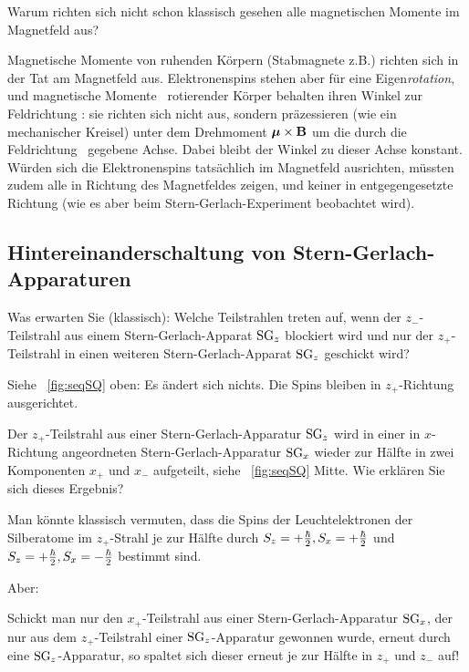\begin{zfrage}
 Warum richten sich nicht schon klassisch gesehen alle magnetischen Momente im Magnetfeld aus? 
\end{zfrage}
\begin{antw}
 Magnetische Momente von ruhenden K\"orpern (Stabmagnete z.B.) richten sich in der Tat am Magnetfeld aus. Elektronenspins stehen aber f\"ur eine Eigen\emph{rotation}, und magnetische Momente \magnmom\ rotierender K\"orper behalten ihren Winkel zur Feldrichtung \magnf: sie richten sich nicht aus, sondern pr\"azessieren (wie ein mechanischer Kreisel) unter dem Drehmoment $\boldsymbol{\mu} \times \mathbf{B}$ um die durch die Feldrichtung \magnf\ gegebene Achse. Dabei bleibt der Winkel zu dieser Achse konstant. W\"urden sich die Elektronenspins tats\"achlich im Magnetfeld ausrichten, m\"ussten zudem alle in Richtung des Magnetfeldes zeigen, und keiner in entgegengesetzte Richtung (wie es aber beim Stern-Gerlach-Experiment beobachtet wird).
\end{antw}

\subsection{Hintereinanderschaltung von Stern-Gerlach-Apparaturen}
\begin{frage}
 Was erwarten Sie (klassisch): Welche Teilstrahlen treten auf, wenn der $z_-$-Teilstrahl aus einem Stern-Gerlach-Apparat $\text{SG}_z$ blockiert wird und nur der $z_+$-Teilstrahl in einen weiteren Stern-Gerlach-Apparat $\text{SG}_z$ geschickt wird?
\end{frage}
\begin{obs}
 Siehe \figurename{}~\ref{fig:seqSQ} oben: Es \"andert sich nichts. Die Spins bleiben in $z_+$-Richtung ausgerichtet.
\end{obs}

\begin{frage}
 Der $z_+$-Teilstrahl aus einer Stern-Gerlach-Apparatur $\text{SG}_z$ wird in einer in $x$-Richtung angeordneten Stern-Gerlach-Apparatur $\text{SG}_x$ wieder zur H\"alfte in zwei Komponenten $x_+$ und $x_-$ aufgeteilt, siehe \figurename{}~\ref{fig:seqSQ} Mitte. Wie erkl\"aren Sie sich dieses Ergebnis?
\end{frage}
Man k\"onnte klassisch vermuten, dass die Spins der Leuchtelektronen der Silberatome im $z_+$-Strahl je zur H\"alfte durch $S_z = +\frac{\hbar}{2}, S_x = +\frac{\hbar}{2}$ und $S_z = +\frac{\hbar}{2}, S_x = -\frac{\hbar}{2}$ bestimmt sind.

Aber:
\begin{obs}
Schickt man nur den $x_+$-Teilstrahl aus einer Stern-Gerlach-Apparatur $\text{SG}_x$, der nur aus dem $z_+$-Teilstrahl einer $\text{SG}_z$-Apparatur gewonnen wurde, erneut durch eine $\text{SG}_z$-Apparatur, so spaltet sich dieser erneut je zur H\"alfte in $z_+$ und $z_-$ auf!
\end{obs}

